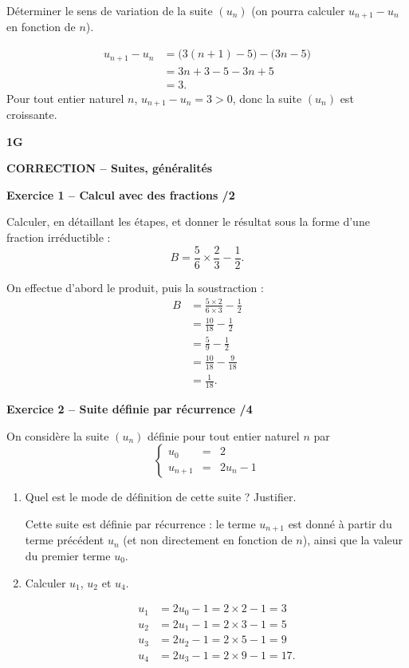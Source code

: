 \documentclass[10pt,a4paper]{article}
\renewcommand{\niveau}{1G}
\renewcommand{\chapitre}{Suites, généralités}
\renewcommand{\interroversion}[1]{
    \noindent\textbf{\niveau}

    \vspace{-0.5cm}
    \begin{center}
        \textbf{\large CORRECTION -- \chapitre}
    \end{center}

    \vspace{0.1cm}
}
\begin{document}
Déterminer le sens de variation de la suite \((u_n)\) (on pourra calculer \(u_{n+1}-u_n\) en fonction de \(n\)).

\[
\begin{aligned}
u_{n+1}-u_n &= \bigl(3(n+1)-5\bigr)-\bigl(3n-5\bigr)\\
            &= 3n+3-5-3n+5\\
            &= 3.
\end{aligned}
\]
Pour tout entier naturel \(n\), \(u_{n+1}-u_n=3>0\), donc la suite \((u_n)\) est croissante.

\newpage


\interroversion{B}

\textbf{Exercice 1 -- Calcul avec des fractions \hfill /2}

Calculer, en détaillant les étapes, et donner le résultat sous la forme d'une fraction irréductible :
\[
B = \frac{5}{6}\times\frac{2}{3}-\frac{1}{2}.
\]

On effectue d'abord le produit, puis la soustraction :
\[
\begin{aligned}
B &= \frac{5\times2}{6\times3}-\frac{1}{2}\\
  &= \frac{10}{18}-\frac{1}{2}\\
  &= \frac{5}{9}-\frac{1}{2}\\
  &= \frac{10}{18}-\frac{9}{18}\\
  &= \frac{1}{18}.
\end{aligned}
\]

\textbf{Exercice 2 -- Suite définie par récurrence \hfill /4}

On considère la suite \((u_n)\) définie pour tout entier naturel \(n\) par
\[
\left\{\begin{array}{rcl}
u_0 &=& 2 \\
u_{n+1} &=& 2u_n-1
\end{array}\right.
\]

\begin{enumerate}
\item Quel est le mode de définition de cette suite ? Justifier.

Cette suite est définie par récurrence : le terme \(u_{n+1}\) est donné à partir du terme précédent \(u_n\) (et non directement en fonction de \(n\)), ainsi que la valeur du premier terme \(u_0\).

\item Calculer \(u_1\), \(u_2\) et \(u_4\).

\[
\begin{aligned}
u_1 &= 2u_0-1 = 2\times2-1 = 3\\
u_2 &= 2u_1-1 = 2\times3-1 = 5\\
u_3 &= 2u_2-1 = 2\times5-1 = 9\\
u_4 &= 2u_3-1 = 2\times9-1 = 17.
\end{aligned}
\]
\end{enumerate}
\end{document}
